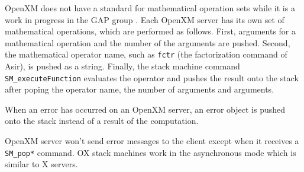 OpenXM does not have a standard for mathematical operation sets
while it is a work in progress in the GAP group \cite{gap}.
Each OpenXM server has its own set of mathematical operations,
which are performed as follows.
First, arguments for a mathematical operation
and the number of the arguments are pushed.
Second, 
the mathematical operator name, 
such as {\tt fctr} (the factorization command of Asir),
is pushed as a string.
Finally, the stack machine command
{\tt SM\_executeFunction} evaluates the operator and
pushes the result onto the stack
after poping the operator name, the number of arguments
and arguments.

When an error has occurred on an OpenXM server,
an error object is pushed onto the stack 
instead of a result of the computation.

OpenXM server won't send error messages to the client
except when it receives a {\tt SM\_pop*} command.
OX stack machines work in the asynchronous mode which is similar 
to X servers.





